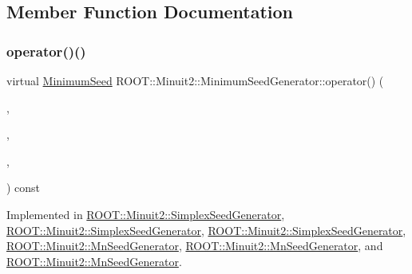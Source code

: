 \subsection{Member Function Documentation}
\mbox{\label{classROOT_1_1Minuit2_1_1MinimumSeedGenerator_ae71de52027d3f0c7fa202c7cf65b947a}} 
\subsubsection{\texorpdfstring{operator()()}{operator()()}\hspace{0.1cm}{\footnotesize\ttfamily [1/6]}}
{\footnotesize\ttfamily virtual \mbox{\hyperlink{classROOT_1_1Minuit2_1_1MinimumSeed}{Minimum\+Seed}} R\+O\+O\+T\+::\+Minuit2\+::\+Minimum\+Seed\+Generator\+::operator() (\begin{DoxyParamCaption}\item[{const \mbox{\hyperlink{classROOT_1_1Minuit2_1_1MnFcn}{Mn\+Fcn}} \&}]{,  }\item[{const \mbox{\hyperlink{classROOT_1_1Minuit2_1_1GradientCalculator}{Gradient\+Calculator}} \&}]{,  }\item[{const \mbox{\hyperlink{classROOT_1_1Minuit2_1_1MnUserParameterState}{Mn\+User\+Parameter\+State}} \&}]{,  }\item[{const \mbox{\hyperlink{classROOT_1_1Minuit2_1_1MnStrategy}{Mn\+Strategy}} \&}]{ }\end{DoxyParamCaption}) const\hspace{0.3cm}{\ttfamily [pure virtual]}}



Implemented in \mbox{\hyperlink{classROOT_1_1Minuit2_1_1SimplexSeedGenerator_aa0c427acb85f9a47a0abaecbf85b1f5c}{R\+O\+O\+T\+::\+Minuit2\+::\+Simplex\+Seed\+Generator}}, \mbox{\hyperlink{classROOT_1_1Minuit2_1_1SimplexSeedGenerator_a48f1bb260753e6c6f053072d4754a028}{R\+O\+O\+T\+::\+Minuit2\+::\+Simplex\+Seed\+Generator}}, \mbox{\hyperlink{classROOT_1_1Minuit2_1_1SimplexSeedGenerator_a48f1bb260753e6c6f053072d4754a028}{R\+O\+O\+T\+::\+Minuit2\+::\+Simplex\+Seed\+Generator}}, \mbox{\hyperlink{classROOT_1_1Minuit2_1_1MnSeedGenerator_a654d0f1b67cd1a3a17de8334ba811ef0}{R\+O\+O\+T\+::\+Minuit2\+::\+Mn\+Seed\+Generator}}, \mbox{\hyperlink{classROOT_1_1Minuit2_1_1MnSeedGenerator_a1c06ece239f548163beb232600dc8cc3}{R\+O\+O\+T\+::\+Minuit2\+::\+Mn\+Seed\+Generator}}, and \mbox{\hyperlink{classROOT_1_1Minuit2_1_1MnSeedGenerator_a1c06ece239f548163beb232600dc8cc3}{R\+O\+O\+T\+::\+Minuit2\+::\+Mn\+Seed\+Generator}}.

